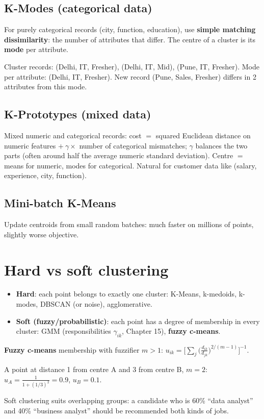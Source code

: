 \subsection{K-Modes (categorical data)}
For purely categorical records (city, function, education), use \textbf{simple matching dissimilarity}: the number of attributes that differ. The centre of a cluster
is its \textbf{mode} per attribute.
\begin{example}[: k-modes]
Cluster records: (Delhi, IT, Fresher), (Delhi, IT, Mid), (Pune, IT, Fresher). Mode per attribute: (Delhi, IT, Fresher). New record (Pune, Sales, Fresher) differs
in 2 attributes from this mode.
\end{example}

\subsection{K-Prototypes (mixed data)}
Mixed numeric and categorical records: cost $=$ squared Euclidean distance on numeric features $+\ \gamma\times$ number of categorical mismatches; $\gamma$ balances
the two parts (often around half the average numeric standard deviation). Centre $=$ means for numeric, modes for categorical. Natural for customer data like
(salary, experience, city, function).

\subsection{Mini-batch K-Means}
Update centroids from small random batches: much faster on millions of points, slightly worse objective.

\section{Hard vs soft clustering}
\begin{itemize}
\item \textbf{Hard}: each point belongs to exactly one cluster: K-Means, k-medoids, k-modes, DBSCAN (or noise), agglomerative.
\item \textbf{Soft (fuzzy/probabilistic)}: each point has a degree of membership in every cluster: GMM (responsibilities $\gamma_{ik}$, Chapter 15), \textbf{fuzzy
  c-means}.
\end{itemize}
\textbf{Fuzzy c-means} membership with fuzzifier $m > 1$: $u_{ik} = \Big[\sum_j\big(\frac{d_{ik}}{d_{jk}}\big)^{2/(m-1)}\Big]^{-1}$.
\begin{example}
A point at distance 1 from centre A and 3 from centre B, $m = 2$: $u_A = \frac{1}{1 + (1/3)^2} = 0.9$, $u_B = 0.1$.
\end{example}
Soft clustering suits overlapping groups: a candidate who is 60\% ``data analyst'' and 40\% ``business analyst'' should be recommended both kinds of jobs.

